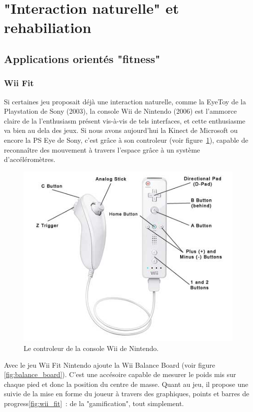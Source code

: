 
\section{"Interaction naturelle" et rehabiliation}
  
\subsection{Applications orientés "fitness"}

\subsubsection{Wii Fit}

Si certaines jeu proposait déjà une interaction naturelle, comme la EyeToy 
de la Playstation de Sony (2003), la console Wii de Nintendo (2006) est 
l'ammorce claire de la
l'enthusiasm présent vis-à-vis de tels interfaces, et cette enthusiasme va bien
au dela des jeux. 
Si nous avons aujourd'hui la Kinect de Microsoft ou encore la
PS Eye de Sony, c'est grâce à son controleur (voir figure~\ref{fig:wii}), 
capable de reconnaître des mouvement à 
travers l'espace grâce à un système d'accéléromètres. 

\begin{figure}[h!]
\centering
\includegraphics[width=0.7\linewidth]{images/wii_diagram}
\caption{Le controleur de la console Wii de Nintendo.}
\label{fig:wii}
\end{figure}

Avec le jeu Wii Fit Nintendo ajoute la Wii Balance Board (voir figure 
\ref{fig:balance_board}). C'est une accésoire capable de mesurer le 
poids mis sur chaque pied et donc la position du centre de masse. Quant au jeu,
il propose une suivie de la mise en forme du joueur à travers des graphiques, 
points et barres de progress\ref{fig:wii_fit}~: de la "gamification", 
tout simplement.

